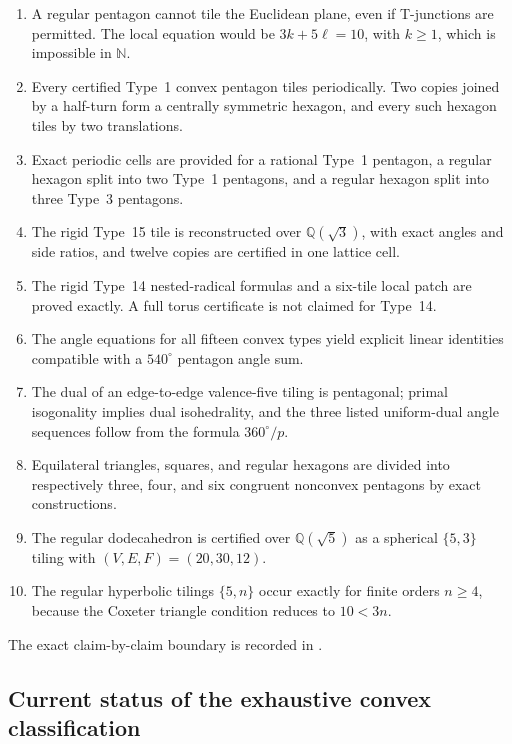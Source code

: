 \documentclass[11pt]{article}
\theoremstyle{remark}
\newcommand{\N}{\mathbb N}
\newcommand{\Q}{\mathbb Q}
\newcommand{\code}[1]{\texttt{\detokenize{#1}}}
\newcommand{\Qsqrt}[1]{\Q(\sqrt{#1})}
\begin{document}
\begin{enumerate}[label=\textbf{R\arabic*.},leftmargin=3.2em]
\item A regular pentagon cannot tile the Euclidean plane, even if T-junctions
are permitted.  The local equation would be \(3k+5\ell=10\), with
\(k\geq1\), which is impossible in \(\N\).
\item Every certified Type~1 convex pentagon tiles periodically.  Two copies
joined by a half-turn form a centrally symmetric hexagon, and every such
hexagon tiles by two translations.
\item Exact periodic cells are provided for a rational Type~1 pentagon, a
regular hexagon split into two Type~1 pentagons, and a regular hexagon split
into three Type~3 pentagons.
\item The rigid Type~15 tile is reconstructed over \(\Qsqrt3\), with exact
angles and side ratios, and twelve copies are certified in one lattice cell.
\item The rigid Type~14 nested-radical formulas and a six-tile local patch are
proved exactly.  A full torus certificate is not claimed for Type~14.
\item The angle equations for all fifteen convex types yield explicit linear
identities compatible with a \(540^\circ\) pentagon angle sum.
\item The dual of an edge-to-edge valence-five tiling is pentagonal; primal
isogonality implies dual isohedrality, and the three listed uniform-dual angle
sequences follow from the formula \(360^\circ/p\).
\item Equilateral triangles, squares, and regular hexagons are divided into
respectively three, four, and six congruent nonconvex pentagons by exact
constructions.
\item The regular dodecahedron is certified over \(\Qsqrt5\) as a spherical
\(\{5,3\}\) tiling with \((V,E,F)=(20,30,12)\).
\item The regular hyperbolic tilings \(\{5,n\}\) occur exactly for finite
orders \(n\geq4\), because the Coxeter triangle condition reduces to
\(10<3n\).
\end{enumerate}

The exact claim-by-claim boundary is recorded in \code{THEOREM_LEDGER.md}.

\subsection{Current status of the exhaustive convex classification}
\end{document}
